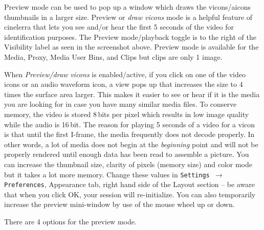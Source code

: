 Preview mode can be used to pop up a window which draws the vicons/aicons thumbnails in a larger size.  
Preview or \textit{draw vicons} mode is a helpful feature of cinelerra that lets you see and/or hear the first 5 seconds of the video for identification purposes. 
The Preview mode/playback toggle is to the right of the Visibility label as seen in the screenshot above. 
Preview mode is available for the Media, Proxy, Media User Bins, and Clips but clips are only 1 image.

When \textit{Preview/draw vicons} is enabled/active, if you click on one of the video icons or an audio waveform icon, a view pops up that increases the size to 4 times the surface area larger. 
This makes it easier to see or hear if it is the media you are looking for in case you have many similar media files. 
To conserve memory, the video is stored 8\,bits per pixel which results in low image quality while the audio is 16\,bit. 
The reason for playing 5 seconds of a video for a vicon is that until the first I-frame, the media frequently does not decode properly.  
In other words, a lot of media does not begin at the \textit{beginning} point and will not be properly rendered until enough data has been read to assemble a picture.  
You can increase the thumbnail size, clarity of pixels (memory size) and color mode but it takes a lot more memory.  
Change these values in \texttt{Settings $\rightarrow$ Preferences}, Appearance tab, right hand side of the Layout section -- be aware that when you click OK, your session will re-initialize.  
You can also temporarily increase the preview mini-window by use of the mouse wheel up or down.

There are 4 options for the preview mode.

